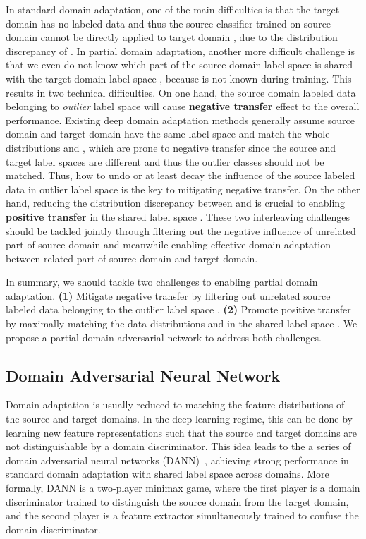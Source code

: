 \documentclass[runningheads]{llncs}
\begin{document}
In standard domain adaptation, one of the main difficulties is that the target domain has no labeled data and thus the source classifier  trained on source domain  cannot be directly applied to target domain , due to the distribution discrepancy of . In partial domain adaptation, another more difficult challenge is that we even do not know which part of the source domain label space  is shared with the target domain label space , because  is not known during training. This results in two technical difficulties.
On one hand, the source domain labeled data belonging to \emph{outlier} label space  will cause \textbf{negative transfer} effect to the overall performance. 
Existing deep domain adaptation methods \cite{cite:ICML15DAN,cite:ICML15RevGrad,cite:ICCV15SDT,cite:NIPS16RTN} generally assume source domain and target domain have the same label space and match the whole distributions  and , which are prone to negative transfer since the source and target label spaces are different and thus the outlier classes should not be matched.
Thus, how to undo or at least decay the influence of the source labeled data in outlier label space  is the key to mitigating negative transfer.
On the other hand, reducing the distribution discrepancy between  and  is crucial to enabling \textbf{positive transfer} in the shared label space .
These two interleaving challenges should be tackled jointly through filtering out the negative influence of unrelated part of source domain and meanwhile enabling effective domain adaptation between related part of source domain and target domain.

In summary, we should tackle two challenges to enabling partial domain adaptation. \textbf{(1)} Mitigate negative transfer by filtering out unrelated source labeled data belonging to the outlier label space . \textbf{(2)} Promote positive transfer by maximally matching the data distributions  and  in the shared label space . We propose a partial domain adversarial network to address both challenges.

\subsection{Domain Adversarial Neural Network}
Domain adaptation is usually reduced to matching the feature distributions of the source and target domains. In the deep learning regime, this can be done by learning new feature representations such that the source and target domains are not distinguishable by a domain discriminator. This idea leads to the a series of domain adversarial neural networks (DANN)~\cite{cite:ICML15RevGrad,cite:ICCV15SDT}, achieving strong performance in standard domain adaptation with shared label space across domains. More formally, DANN is a two-player minimax game, where the first player is a domain discriminator  trained to distinguish the source domain from the target domain, and the second player is a feature extractor  simultaneously trained to confuse the domain discriminator.
\end{document}
